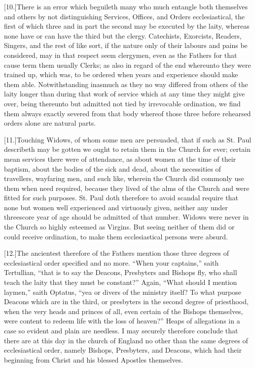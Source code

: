 [10.]There is an error which beguileth many who much entangle both themselves and others by not distinguishing Services, Offices, and Orders ecclesiastical, the first of which three and in part the second may be executed by the laity, whereas none have or can have the third but the clergy. Catechists, Exorcists, Readers, Singers, and the rest of like sort, if the nature only of their labours and pains be considered, 
 may in that respect seem clergymen, even as the Fathers for that cause term them usually Clerks; as also in regard of the end whereunto they were trained up, which was, to be ordered when years and experience should make them able. Notwithstanding inasmuch as they no way differed from others of the laity longer than during that work of service which at any time they might give over, being thereunto but admitted not tied by irrevocable ordination, we find them always exactly severed from that body whereof those three before rehearsed orders alone are natural parts.

[11.]Touching Widows, of whom some men are persuaded, that if such as St. Paul describeth may be gotten we ought to retain them in the Church for ever; certain mean services there were of attendance, as about women at the time of their baptism, about the bodies of the sick and dead, about the necessities of travellers, wayfaring men, and such like, wherein the Church did commonly use them when need required, because they lived of the alms of the Church and were fitted for such purposes. St. Paul doth therefore to avoid scandal require that none but women well experienced and virtuously given, neither any under threescore year of  age should be admitted of that number.
 Widows were never in the Church so highly esteemed as Virgins. But seeing neither of them did or could receive ordination, to make them ecclesiastical persons were absurd.

[12.]The ancientest therefore of the Fathers mention those three degrees of ecclesiastical order specified and no more. “When your captains,” saith Tertullian, “that is to say the Deacons, Presbyters and Bishops fly, who shall teach the laity that they must be constant?” Again, “What should I mention laymen,” saith Optatus, “yea or divers of the ministry itself? To what purpose Deacons which are in the third, or presbyters in the second degree of priesthood, when the very heads and princes of all, even certain of the Bishops themselves, were content to redeem life with the loss of heaven?” Heaps of allegations in a case so evident and plain are needless. I may securely therefore conclude that there are at this day in the church of England no other than the same degrees of ecclesiastical order, namely Bishops, Presbyters, and Deacons, which had their beginning from Christ and his blessed Apostles themselves.

